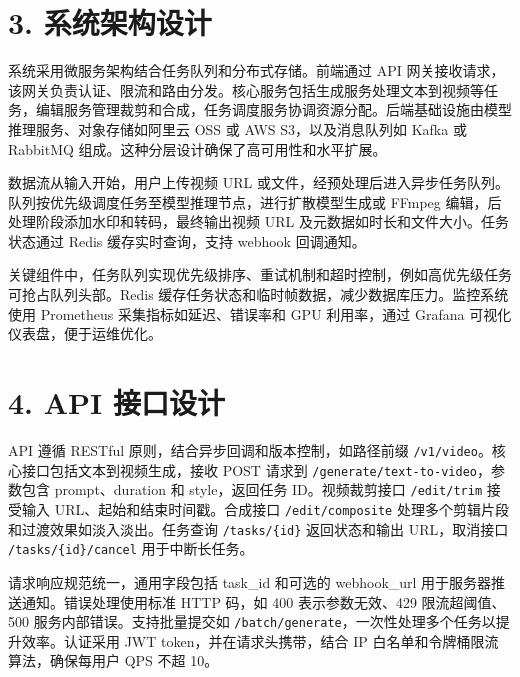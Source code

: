 \chapter{3. 系统架构设计}
系统采用微服务架构结合任务队列和分布式存储。前端通过 API 网关接收请求，该网关负责认证、限流和路由分发。核心服务包括生成服务处理文本到视频等任务，编辑服务管理裁剪和合成，任务调度服务协调资源分配。后端基础设施由模型推理服务、对象存储如阿里云 OSS 或 AWS S3，以及消息队列如 Kafka 或 RabbitMQ 组成。这种分层设计确保了高可用性和水平扩展。\par
数据流从输入开始，用户上传视频 URL 或文件，经预处理后进入异步任务队列。队列按优先级调度任务至模型推理节点，进行扩散模型生成或 FFmpeg 编辑，后处理阶段添加水印和转码，最终输出视频 URL 及元数据如时长和文件大小。任务状态通过 Redis 缓存实时查询，支持 webhook 回调通知。\par
关键组件中，任务队列实现优先级排序、重试机制和超时控制，例如高优先级任务可抢占队列头部。Redis 缓存任务状态和临时帧数据，减少数据库压力。监控系统使用 Prometheus 采集指标如延迟、错误率和 GPU 利用率，通过 Grafana 可视化仪表盘，便于运维优化。\par
\chapter{4. API 接口设计}
API 遵循 RESTful 原则，结合异步回调和版本控制，如路径前缀 \texttt{/v1/video}。核心接口包括文本到视频生成，接收 POST 请求到 \texttt{/generate/text-to-video}，参数包含 prompt、duration 和 style，返回任务 ID。视频裁剪接口 \texttt{/edit/trim} 接受输入 URL、起始和结束时间戳。合成接口 \texttt{/edit/composite} 处理多个剪辑片段和过渡效果如淡入淡出。任务查询 \texttt{/tasks/\{{}id\}{}} 返回状态和输出 URL，取消接口 \texttt{/tasks/\{{}id\}{}/cancel} 用于中断长任务。\par
请求响应规范统一，通用字段包括 task\_{}id 和可选的 webhook\_{}url 用于服务器推送通知。错误处理使用标准 HTTP 码，如 400 表示参数无效、429 限流超阈值、500 服务内部错误。支持批量提交如 \texttt{/batch/generate}，一次性处理多个任务以提升效率。认证采用 JWT token，并在请求头携带，结合 IP 白名单和令牌桶限流算法，确保每用户 QPS 不超 10。\par
